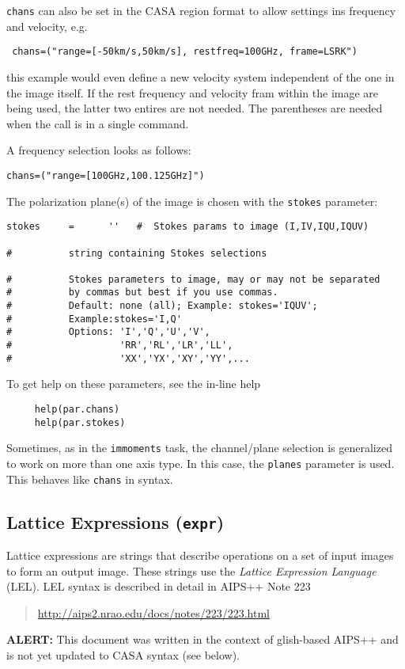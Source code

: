 {\tt chans} can also be set in the CASA region format to allow
settings ins frequency and velocity, e.g.
\small
\begin{verbatim}
 chans=("range=[-50km/s,50km/s], restfreq=100GHz, frame=LSRK")
\end{verbatim}
\normalsize
this example would even define a new velocity system independent of
the one in the image itself. If the rest frequency and velocity fram
within the image are being used, the latter two entires are not
needed. The parentheses are needed when the call is in a single
command. 

A frequency selection looks as follows:

\small
\begin{verbatim} 
chans=("range=[100GHz,100.125GHz]")
\end{verbatim}
\normalsize


The polarization plane(s) of the image is chosen with the {\tt stokes}
parameter:
\small
\begin{verbatim}
stokes     =      ''   #  Stokes params to image (I,IV,IQU,IQUV)

#          string containing Stokes selections

#          Stokes parameters to image, may or may not be separated
#          by commas but best if you use commas.
#          Default: none (all); Example: stokes='IQUV';  
#          Example:stokes='I,Q'
#          Options: 'I','Q','U','V',
#                   'RR','RL','LR','LL',
#                   'XX','YX','XY','YY',...
\end{verbatim}
\normalsize

To get help on these parameters, see the in-line help
\small
\begin{verbatim}
     help(par.chans)
     help(par.stokes)
\end{verbatim}
\normalsize

Sometimes, as in the {\tt immoments} task, the channel/plane 
selection is generalized to work on more than one axis type.
In this case, the {\tt planes} parameter is used.  This behaves
like {\tt chans} in syntax.

\subsection{Lattice Expressions ({\tt expr})}
\label{section:analysis.pars.lattice}

Lattice expressions are strings that describe operations on a
set of input images to form an output image.  These strings
use the {\em Lattice Expression Language} (LEL).  LEL syntax
is described in detail in AIPS++ Note 223 
\begin{quote}
   \url{http://aips2.nrao.edu/docs/notes/223/223.html}
\end{quote}
{\bf ALERT:} This document was written in the context of
glish-based AIPS++ and is not yet updated to CASA syntax 
(see below).

